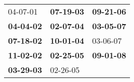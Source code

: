 \begin{supertabular}{p{0.33\columnwidth}p{0.33\columnwidth}p{0.33\columnwidth}}
          04-07-01\textsuperscript{} &  \textbf{07-19-03\textsuperscript{}} &  \textbf{09-21-06\textsuperscript{}} \\
 \textbf{04-04-02\textsuperscript{}} &  \textbf{02-07-04\textsuperscript{}} &  \textbf{03-05-07\textsuperscript{}} \\
 \textbf{07-18-02\textsuperscript{}} &  \textbf{10-01-04\textsuperscript{}} &           03-06-07\textsuperscript{} \\
 \textbf{11-02-02\textsuperscript{}} &  \textbf{02-25-05\textsuperscript{}} &  \textbf{09-01-08\textsuperscript{}} \\
 \textbf{03-29-03\textsuperscript{}} &           02-26-05\textsuperscript{} &                                      \\
\end{supertabular}
